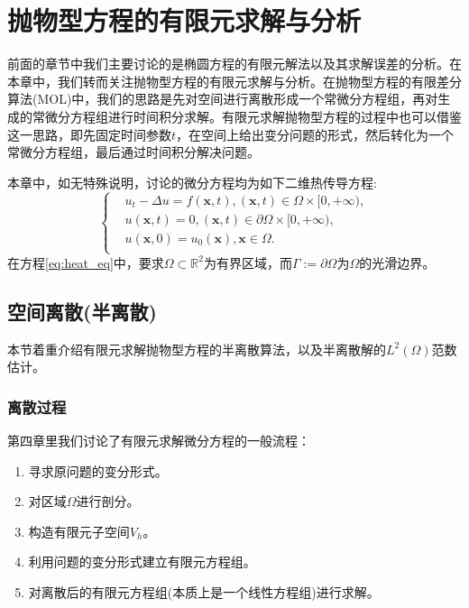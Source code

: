 \chapter{抛物型方程的有限元求解与分析}
前面的章节中我们主要讨论的是椭圆方程的有限元解法以及其求解误差的分析。在本章中，我们转而关注抛物型方程的有限元求解与分析。在抛物型方程的有限差分算法(MOL)中，我们的思路是先对空间进行离散形成一个常微分方程组，再对生成的常微分方程组进行时间积分求解。有限元求解抛物型方程的过程中也可以借鉴这一思路，即先固定时间参数$t$，在空间上给出变分问题的形式，然后转化为一个常微分方程组，最后通过时间积分解决问题。

本章中，如无特殊说明，讨论的微分方程均为如下二维热传导方程:
\begin{equation}
    \label{eq:heat_eq}
    \left\{
        \begin{aligned}
            &u_{t}-\Delta u=f(\mathbf{x},t),(\mathbf{x},t)\in\Omega\times[0,+\infty),\\
            &u(\mathbf{x},t)=0,(\mathbf{x},t)\in\partial\Omega\times[0,+\infty),\\
            &u(\mathbf{x},0)=u_{0}(\mathbf{x}),\mathbf{x}\in\Omega.\\
        \end{aligned}
    \right.
\end{equation}
在方程\eqref{eq:heat_eq}中，要求$\Omega\subset\mathbb{R}^{2}$为有界区域，而$\Gamma:=\partial\Omega$为$\Omega$的光滑边界。

\section{空间离散(半离散)}
本节着重介绍有限元求解抛物型方程的半离散算法，以及半离散解的$L^{2}(\Omega)$范数估计。

\subsection{离散过程}
第四章里我们讨论了有限元求解微分方程的一般流程：
\begin{enumerate}
    \item 寻求原问题的变分形式。
    \item 对区域$\Omega$进行剖分。
    \item 构造有限元子空间$V_{h}$。
    \item 利用问题的变分形式建立有限元方程组。
    \item 对离散后的有限元方程组(本质上是一个线性方程组)进行求解。
\end{enumerate}